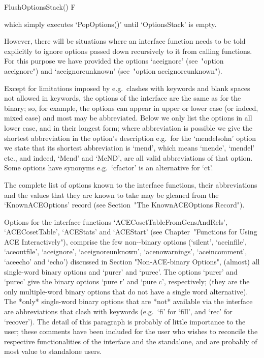 \>FlushOptionsStack() F

which simply executes `PopOptions()' until `OptionsStack' is empty.

However, there will be situations where an {\ACE}  interface  function
needs to be told explicitly to ignore options passed down  recursively
to it from calling functions. For this purpose we  have  provided  the
options `aceignore' (see~"option  aceignore")  and  `aceignoreunknown'
(see~"option aceignoreunknown").


Except for limitations imposed by {\GAP}  e.g.\  clashes  with  {\GAP}
keywords and blank spaces not allowed in keywords, the options of  the
{\ACE} interface are the same as for the binary; so, for example,  the
options can appear in upper or lower case (or indeed, mixed case)  and
most may be abbreviated. Below we only list the options in  all  lower
case, and in their longest form; where  abbreviation  is  possible  we
give the shortest abbreviation in the  option's  description  e.g.~for
the `mendelsohn' option we state that  its  shortest  abbreviation  is
`mend', which means `mende', `mendel' etc.,  and  indeed,  `Mend'  and
`MeND', are all valid abbreviations of that option. Some options  have
synonyms e.g.~`cfactor' is an alternative for `ct'.

The complete list of {\ACE} options  known  to  the  {\ACE}  interface
functions, their abbreviations and the values that they are  known  to
take  may  be  gleaned  from   the   `KnownACEOptions'   record   (see
Section~"The KnownACEOptions Record").

Options      for      the       {\ACE}       interface       functions
`ACECosetTableFromGensAndRels',   `ACECosetTable',   `ACEStats'    and
`ACEStart' (see  Chapter~"Functions  for  Using  ACE  Interactively"),
comprise the few  non-{\ACE}-binary  options  (`silent',  `aceinfile',
`aceoutfile',   `aceignore',   `aceignoreunknown',    `acenowarnings',
`aceincomment',     `aceecho'     and     `echo')     discussed     in
Section "Non-ACE-binary  Options",  (almost)  all  single-word  {\ACE}
binary options and  `purer'  and  `purec'.  The  options  `purer'  and
`purec' give  the  {\ACE}  binary  options  `pure  r'  and  `pure  c',
respectively; (they are the only multiple-word {\ACE}  binary  options
that do not have a single word alternative).  The  *only*  single-word
{\ACE}  binary  options  that  are  *not*  available  via  the  {\ACE}
interface are abbreviations that clash with {\GAP} keywords (e.g.~`fi'
for `fill', and `rec' for `recover'). The detail of this paragraph  is
probably of little importance to the {\GAP} user; these comments  have
been included for the user who  wishes  to  reconcile  the  respective
functionalities of the {\ACE} interface and the {\ACE} standalone, and
are probably of most value to standalone users.

